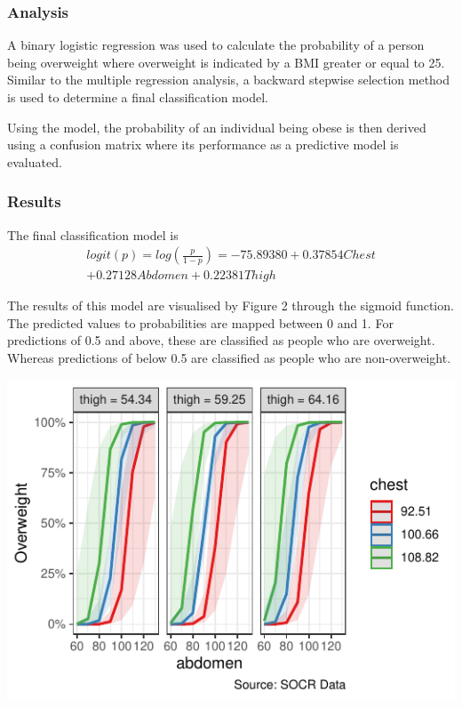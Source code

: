 \documentclass[a4paper,9pt,twocolumn,twoside,]{pinp}
\begin{document}
\hypertarget{analysis-2}{%
\subsubsection{Analysis}\label{analysis-2}}

A binary logistic regression was used to calculate the probability of a
person being overweight where overweight is indicated by a BMI greater
or equal to 25. Similar to the multiple regression analysis, a backward
stepwise selection method is used to determine a final classification
model.

Using the model, the probability of an individual being obese is then
derived using a confusion matrix where its performance as a predictive
model is evaluated.

\hypertarget{results-1}{%
\subsubsection{Results}\label{results-1}}

The final classification model is \[
\begin{aligned}
logit(p)=log(\frac{p}{1-p})=-75.89380+0.37854Chest\\ +0.27128Abdomen+0.22381Thigh
\end{aligned}
\]

The results of this model are visualised by Figure 2 through the sigmoid
function. The predicted values to probabilities are mapped between 0 and
1. For predictions of 0.5 and above, these are classified as people who
are overweight. Whereas predictions of below 0.5 are classified as
people who are non-overweight.

\begin{center}\includegraphics{Executive_Report_files/figure-latex/unnamed-chunk-2-1} \end{center}
\end{document}

